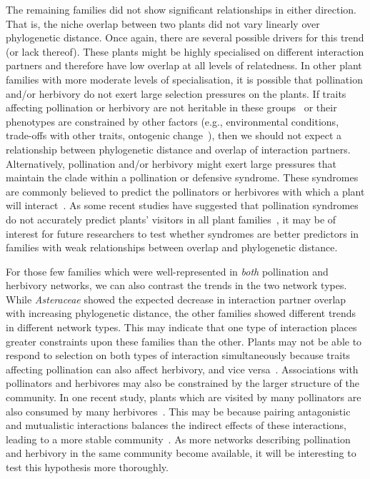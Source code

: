 \documentclass[12pt]{article}
\begin{document}
\begin{spacing}{1.5}
  The remaining families did not show significant relationships 
  in either direction. That is, the niche overlap between two 
  plants did not vary linearly over phylogenetic distance. Once again, there 
  are several possible drivers for this trend (or lack thereof). These plants might 
  be highly specialised on different interaction partners and therefore
  have low overlap at all levels of relatedness. In other plant families
  with more moderate levels of specialisation, it is possible 
  that pollination and/or herbivory do not exert large
  selection pressures on the plants. If traits affecting pollination
  or herbivory are not heritable in these groups~\citep{Kursar2009}
  or their phenotypes are constrained by other factors (e.g., 
  environmental conditions, trade-offs with other traits, ontogenic
  change~\citep{Karinho2014}), then we should not expect a relationship 
  between phylogenetic distance and overlap of interaction partners.
  Alternatively, pollination and/or herbivory might exert large 
  pressures that maintain the clade within a pollination or 
  defensive syndrome. These syndromes are commonly believed to
  predict the pollinators or herbivores with which a plant will 
  interact~\citep{Waser1996,Fenster2004,Ollerton2009,Johnson2014}.
  As some recent studies have suggested that pollination syndromes
  do not accurately predict plants' visitors in all plant 
  families~\citep{Ollerton2009},
  it may be of interest for future researchers to test whether 
  syndromes are better predictors in families with weak 
  relationships between overlap and phylogenetic distance.


  For those few families which were well-represented in \emph{both} pollination
  and herbivory networks, we can also contrast the 
  trends in the two network types. While \emph{Asteraceae} showed the
  expected decrease in interaction partner overlap with increasing
  phylogenetic distance, the other families showed different trends in
  different network types. This may indicate that one type of interaction
  places greater constraints upon these families than the other. Plants
  may not be able to respond to selection on both types of interaction
  simultaneously because traits affecting pollination can also affect herbivory, and vice
  versa~\citep{Strauss1997,Strauss2002,Adler2004,Adler2006,Theis2006}.
  Associations with pollinators and herbivores may also be constrained by the
  larger structure of the community. In one recent study, plants which are 
  visited by many pollinators are also consumed by many herbivores~\citep{Sauve2016}.
  This may be because pairing antagonistic and mutualistic interactions
  balances the indirect effects of these interactions, leading to a
  more stable community~\citep{Sauve2014}. As more networks describing 
  pollination and herbivory in the same community become available, it 
  will be interesting to test this hypothesis more thoroughly.



\end{spacing}
\end{document}
